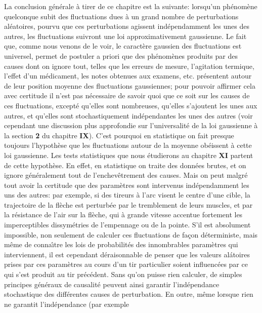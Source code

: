 La conclusion g\'en\'erale \`a tirer de ce chapitre est la suivante: 
lorsqu'un
ph\'enom\`ene quelconque subit des fluctuations dues \`a un
grand
nombre de perturbations al\'eatoires,  pourvu que ces perturbations 
agissent ind\'ependamment les unes des autres,  les fluctuations suivront
une loi approximativement gaussienne.  Le fait que,  comme nous venons de
le voir,  le caract\`ere gaussien des fluctuations est universel,  permet de
postuler a \hbox{priori} que des ph\'enom\`enes produits par des causes dont
on
ignore tout,  telles que les erreurs de mesure,  l'agitation termique, 
l'effet
d'un m\'edicament,  les notes obtenues aux examens, etc. pr\'esentent
autour de leur position moyenne des fluctuations gaussiennes;  pour pouvoir
affirmer cela avec certitude il n'est pas n\'ecessaire de savoir quoi que ce
soit sur les causes de ces fluctuations,  except\'e qu'elles sont nombreuses, 
qu'elles s'ajoutent les unes aux autres,  et qu'elles sont stochastiquement
ind\'ependantes les unes des autres (voir cependant une discussion plus
approfondie sur l'universalit\'e de la loi gaus\-sienne \`a la section
{\bf 2} du chapitre {\bf IX}).
\medskip
C'est pourquoi en statistique on fait presque toujours l'hypoth\`ese que
les fluctuations autour de la moyenne ob\'eissent \`a cette loi 
gaussienne.  Les tests statistiques que nous \'etudierons au chapitre 
{\bf XI} partent de cette hypoth\`ese.  En effet,  en statistique on traite
des donn\'ees brutes,  et on \hbox{ignore} g\'en\'eralement tout de
l'enchev\^etrement des causes.  Mais on peut malgr\'e tout avoir la
certitude que des param\`etres sont intervenus ind\'ependamment les
uns des autres:  par exemple,  si des tireurs \`a l'arc visent le centre
d'une cible,  la trajectoire de la fl\`eche est perturb\'ee par le
tremblement de leurs muscles,  et par la r\'esistance de l'air sur la
fl\`eche,  qui \`a grande vitesse accentue fortement les imperceptibles
dissym\'etries de l'empennage ou de la pointe.  S'il est absolument
impossible,  non seulement de calculer ces fluctuations de fa\c{c}on
d\'eterministe,  mais m\^eme de conna{\^\i}tre les lois de probabilit\'es
des innombrables param\`etres qui interviennent,  il est cependant
d\'eraisonnable de penser que les valeurs al\'atoires prises par ces
param\`etres au cours d'un tir particulier soient influenc\'ees par ce 
qui s'est produit au tir pr\'ec\'edent.  Sans qu'on puisse rien calculer, 
de simples principes g\'en\'eraux de causalit\'e peuvent ainsi garantir
l'ind\'ependance stochastique des diff\'erentes causes de perturbation.
En outre,  m\^eme lorsque rien ne garantit l'ind\'ependance (par exemple
